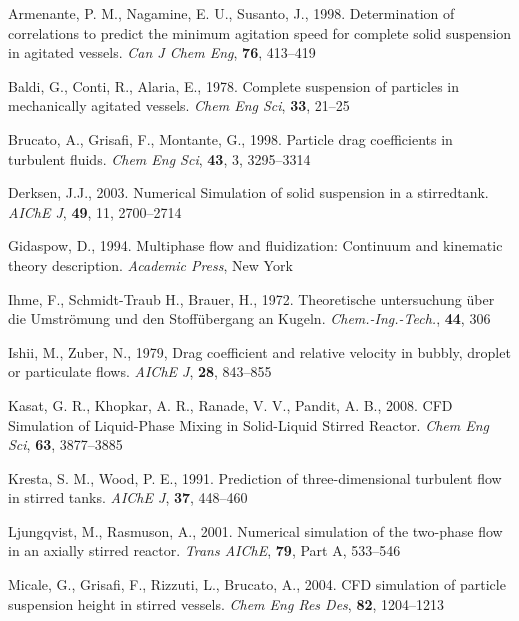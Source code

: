 \begin{thebibliography}{99}

 Armenante, P. M., Nagamine, E. U., Susanto, J., 1998. Determination of correlations to predict the minimum agitation speed for complete solid suspension in agitated vessels. \textit{Can J Chem Eng}, \textbf{76}, 413--419

 Baldi, G., Conti, R., Alaria, E., 1978. Complete suspension of particles in mechanically agitated vessels. \textit{Chem Eng Sci}, \textbf{33}, 21--25 

 Brucato, A., Grisafi, F., Montante, G., 1998. Particle drag coefficients in turbulent fluids. \textit{Chem Eng Sci}, \textbf{43}, 3, 3295--3314

 Derksen, J.J., 2003. Numerical Simulation of solid suspension in a stirredtank. \textit{AIChE J}, \textbf{49}, 11, 2700--2714

 Gidaspow, D., 1994. Multiphase flow and fluidization: Continuum and kinematic theory description. \textit{Academic Press}, New York

 Ihme, F., Schmidt-Traub H., Brauer, H., 1972. Theoretische untersuchung \"uber die Umstr\"omung und den Stoff\"ubergang an Kugeln. \textit{Chem.-Ing.-Tech.}, \textbf{44}, 306

 Ishii, M., Zuber, N., 1979, Drag coefficient and relative velocity in bubbly, droplet or particulate flows. \textit{AIChE J}, \textbf{28}, 843--855 

 Kasat, G. R., Khopkar, A. R., Ranade, V. V., Pandit, A. B., 2008. CFD Simulation of Liquid-Phase Mixing in Solid-Liquid Stirred Reactor. \textit{Chem Eng Sci}, \textbf{63}, 3877--3885

 Kresta, S. M., Wood, P. E., 1991. Prediction of three-dimensional turbulent flow in stirred tanks. \textit{AIChE J}, \textbf{37}, 448--460 

 Ljungqvist, M., Rasmuson, A., 2001. Numerical simulation of the two-phase flow in an axially stirred reactor. \textit{Trans AIChE}, \textbf{79}, Part A, 533--546

 Micale, G., Grisafi, F., Rizzuti, L., Brucato, A., 2004. CFD simulation of particle suspension height in stirred vessels. \textit{Chem Eng Res Des}, \textbf{82}, 1204--1213


\end{thebibliography}
